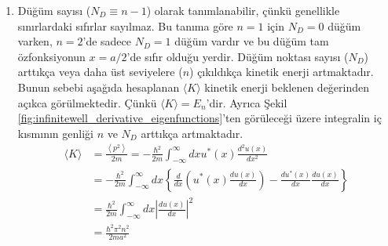 \documentclass[a4paper,12pt, twoside]{article}
\begin{document}
\begin{enumerate}
	
	\item Düğüm sayısı ($N_D \equiv n-1$) olarak tanımlanabilir, çünkü genellikle sınırlardaki sıfırlar sayılmaz. Bu tanıma göre $n=1$ için $N_D=0$ düğüm varken, $n=2$'de sadece $N_D=1$ düğüm vardır ve bu düğüm tam özfonksiyonun $x=a/2$'de sıfır olduğu yerdir. Düğüm noktası sayısı ($N_D$) arttıkça veya daha üst seviyelere ($n$) çıkıldıkça kinetik enerji artmaktadır. Bunun sebebi aşağıda hesaplanan $\langle K \rangle $ kinetik enerji beklenen değerinden açıkca görülmektedir. Çünkü $\langle K \rangle = E_n$'dir. Ayrıca Şekil \ref{fig:infinitewell_derivative_eigenfunctions}'ten görüleceği üzere integralin iç kısmının genliği $n$ ve $N_D$ arttıkça artmaktadır.
	\begin{equation}
	\begin{aligned} 
	\langle K \rangle 
	& = \frac { \left\langle p ^ { 2 } \right\rangle } { 2 m } = - \frac { \hbar ^ { 2 } } { 2 m } \int _ { - \infty } ^ { \infty } d x u ^ { * } ( x ) \frac { d ^ { 2 } u ( x ) } { d x ^ { 2 } } \\ 
	& = - \frac { \hbar ^ { 2 } } { 2 m } \int _ { - \infty } ^ { \infty } d x \left\{ \frac { d } { d x } \left( u ^ { * } ( x ) \frac { d u ( x ) } { d x } \right) - \frac { d u ^ { * } ( x ) } { d x } \frac { d u ( x ) } { d x } \right\} \\ 
	& = \frac { \hbar ^ { 2 } } { 2 m } \int _ { - \infty } ^ { \infty } d x \left| \frac { d u ( x ) } { d x } \right| ^ { 2 } \\
	&= \frac { \hbar ^ { 2 } \pi ^ { 2 } n ^ { 2 } } { 2 m a ^ { 2 } }
	\end{aligned}
	\end{equation}
		

\end{enumerate}
\end{document}
